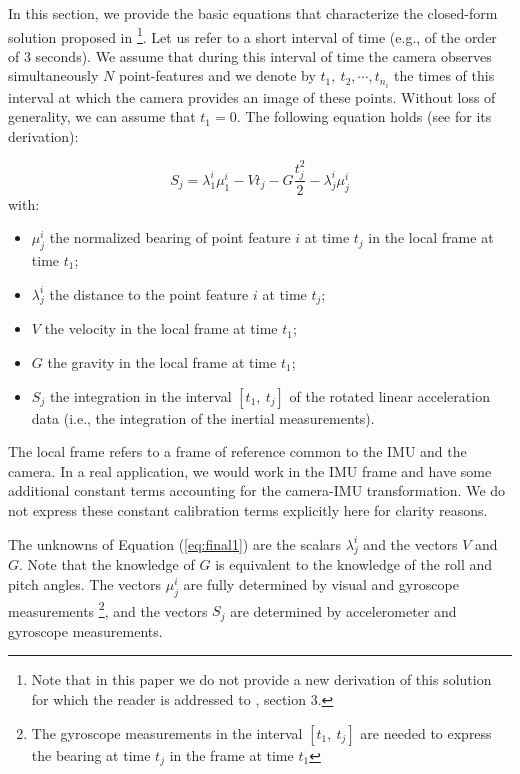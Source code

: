 \documentclass[letterpaper, 10 pt, journal, twoside]{IEEEtran}  %
\begin{document}
In this section, we provide the basic equations that characterize the closed-form solution proposed in \cite{Martinelli2014}\footnote{Note that in this paper we do not provide a new derivation of this solution for which the reader is addressed to \cite{Martinelli2014}, section 3.}.
Let us refer to a short interval of time (e.g., of the order of $3$ seconds). We assume that during this interval of time the camera observes simultaneously $N$ point-features and we denote by $t_1,~t_2,\cdots,t_{n_i}$ the times of this interval at which the camera provides an image of these points. Without loss of generality, we can assume that $t_1=0$.
The following equation holds (see \cite{Martinelli2014} for its derivation):


\begin{equation} \label{eq:final1}
S_j = \lambda_1^i\mu_1^i - V t_j - G \frac{t_j^2}{2} - \lambda^i_j \mu^i_j
\end{equation}
\noindent with:
\begin{itemize}
\item $\mu_j^i$ the normalized bearing of point feature $i$ at time $t_j$ in the local frame at time $t_1$;
\item $\lambda_j^i$ the distance to the point feature $i$ at time $t_j$;
\item $V$ the velocity in the local frame at time $t_1$;
\item $G$ the gravity in the local frame  at time $t_1$;
\item $S_j$ the integration in the interval $[t_1, ~t_j]$ of the rotated linear acceleration data (i.e., the integration of the inertial measurements).
\end{itemize}


The local frame refers to a frame of reference common to the IMU and the camera.
In a real application, we would work in the IMU frame and have some additional constant terms
accounting for the camera-IMU transformation.
We do not express these constant calibration terms explicitly here for clarity reasons.

The unknowns of Equation (\ref{eq:final1}) are the scalars $\lambda_j^i$ and the vectors $V$ and $G$.
Note that the knowledge of $G$ is equivalent to the knowledge of the roll and pitch angles.
The vectors $\mu_j^i$ are fully determined by visual and gyroscope measurements \footnote{The gyroscope measurements in the interval $[t_1, ~t_j]$ are needed to express the bearing at time $t_j$ in the frame at time $t_1$},
and the vectors $S_j$ are determined by accelerometer and gyroscope measurements.
\end{document}
